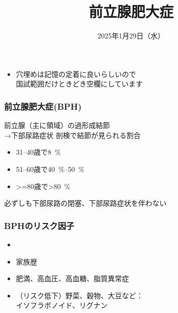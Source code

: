\documentclass[unicode, 12pt]{beamer}
\title{前立腺肥大症}
\date{2025年1月29日（水）}
\begin{document}
\begin{frame}
  \titlepage
\end{frame}
\begin{frame}
  \begin{itemize}
    \item 穴埋めは記憶の定着に良いらしいので\\
      国試範囲だけときどき空欄にしています
  \end{itemize}
\end{frame}
\begin{frame}
  \frametitle{前立腺肥大症(BPH)}
  前立腺（主に領域）の過形成結節\\
  →下部尿路症状
  \vfill
  剖検で結節が見られる割合
  \begin{itemize}
    \item \numrange{31}{40}歳で\qty{8}{\percent}
    \item \numrange{51}{60}歳で\qtyrange{40}{50}{\percent}
    \item \num{>=80}歳で\qty{>80}{\percent}
  \end{itemize}
  \vfill
  必ずしも下部尿路の閉塞、下部尿路症状を伴わない
\end{frame}
\begin{frame}
  \frametitle{BPHのリスク因子}
  \begin{itemize}
    \item {}
    \item 家族歴
    \item 肥満、高血圧、高血糖、脂質異常症

    \item （リスク低下）野菜、穀物、大豆など：\\
      イソフラボノイド、リグナン
  \end{itemize}
\end{frame}
\end{document}

